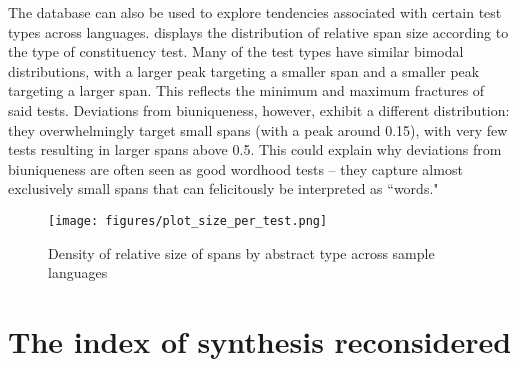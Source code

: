 \documentclass[output=paper,draftmode]{langscibook}
\begin{document}
The database can also be used to explore tendencies associated with certain test types across languages.  displays the distribution of relative span size according to the type of constituency test. Many of the test types have similar bimodal distributions, with a larger peak targeting a smaller span and a smaller peak targeting a larger span. This reflects the minimum and maximum fractures of said tests.
Deviations from biuniqueness, however, exhibit a different distribution: they overwhelmingly target small spans (with a peak around 0.15), with very few tests resulting in larger spans above 0.5. This could explain why deviations from biuniqueness are often seen as good wordhood tests -- they capture almost exclusively small spans that can felicitously be interpreted as ``words."

\begin{figure}
    \texttt{[image: figures/plot\_size\_per\_test.png]}
    \caption{Density of relative size of spans by abstract type across sample languages}
    \label{fig:size-test}
\end{figure}



\section{The index of synthesis reconsidered}
\label{sec:indexofsynthesisreconsidered}
\end{document}
